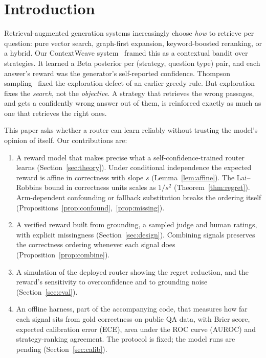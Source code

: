 \documentclass[conference]{IEEEtran}
\theoremstyle{definition}
\theoremstyle{remark}
\begin{document}
\section{Introduction}
Retrieval-augmented generation systems increasingly choose \emph{how} to retrieve per question: pure vector search, graph-first expansion, keyword-boosted reranking, or a hybrid. Our ContextWeave system~\cite{prior-router} framed this as a contextual bandit over strategies. It learned a Beta posterior per (strategy, question type) pair, and each answer's reward was the generator's self-reported confidence. Thompson sampling~\cite{thompson1933,agrawal2012} fixed the exploration defect of an earlier greedy rule. But exploration fixes the \emph{search}, not the \emph{objective}. A strategy that retrieves the wrong passages, and gets a confidently wrong answer out of them, is reinforced exactly as much as one that retrieves the right ones.

This paper asks whether a router can learn reliably without trusting the model's opinion of itself. Our contributions are:
\begin{enumerate}
\item A reward model that makes precise what a self-confidence-trained router learns (Section~\ref{sec:theory}). Under conditional independence the expected reward is affine in correctness with slope $s$ (Lemma~\ref{lem:affine}). The Lai--Robbins bound in correctness units scales as $1/s^2$ (Theorem~\ref{thm:regret}). Arm-dependent confounding or fallback substitution breaks the ordering itself (Propositions~\ref{prop:confound},~\ref{prop:missing}).
\item A verified reward built from grounding, a sampled judge and human ratings, with explicit missingness (Section~\ref{sec:design}). Combining signals preserves the correctness ordering whenever each signal does (Proposition~\ref{prop:combine}).
\item A simulation of the deployed router showing the regret reduction, and the reward's sensitivity to overconfidence and to grounding noise (Section~\ref{sec:eval}).
\item An offline harness, part of the accompanying code, that measures how far each signal sits from gold correctness on public QA data, with Brier score, expected calibration error (ECE), area under the ROC curve (AUROC) and strategy-ranking agreement. The protocol is fixed; the model runs are pending (Section~\ref{sec:calib}).
\end{enumerate}
\end{document}
